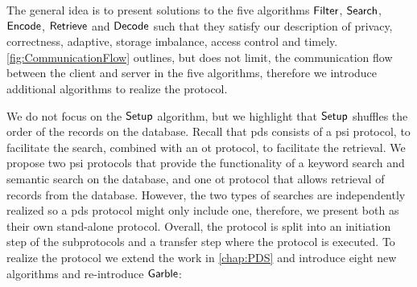 \newcommand{\PreProcess}{\ensuremath{\mathsf{{PreProcess}}}}
\newcommand{\Encrypt}{\ensuremath{\mathsf{{Encrypt}}}}
\newcommand{\Permute}{\ensuremath{\mathsf{{Permute}}}}
\newcommand{\Sort}{\ensuremath{\mathsf{{Sort}}}}
\newcommand{\Decrypt}{\ensuremath{\mathsf{{Decrypt}}}}
\newcommand{\Distance}{\ensuremath{\mathsf{{Distance}}}}
\newcommand{\KeyGen}{\ensuremath{\mathsf{{KeyGen}}}}
The general idea is to present solutions to the five algorithms $ \mathsf{{Filter}} $, $ \mathsf{{Search}} $, $ \mathsf{{Encode}} $, $ \mathsf{{Retrieve}} $ and $ \mathsf{{Decode}} $ such that they satisfy our description of privacy, correctness, adaptive, storage imbalance, access control and timely. \cref{fig:CommunicationFlow} outlines, but does not limit, the communication flow between the client and server in the five algorithms, therefore we introduce additional algorithms to realize the protocol.

We do not focus on the $ \mathsf{{Setup}} $ algorithm, but we highlight that $ \mathsf{{Setup}} $ shuffles the order of the records on the database. Recall that \acrshort{pds} consists of a \acrshort{psi} protocol, to facilitate the search, combined with an \acrshort{ot} protocol, to facilitate the retrieval. We propose two \acrshort{psi} protocols that provide the functionality of a keyword search and semantic search on the database, and one \acrshort{ot} protocol that allows retrieval of records from the database. However, the two types of searches are independently realized so a \acrshort{pds} protocol might only include one, therefore, we present both as their own stand-alone protocol. Overall, the protocol is split into an initiation step of the subprotocols and a transfer step where the protocol is executed. To realize the protocol we extend the work in \cref{chap:PDS} and introduce eight new algorithms and re-introduce $ \mathsf{{Garble}} $:

